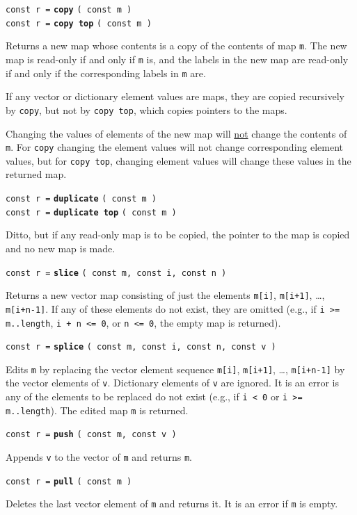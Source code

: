 \documentclass[12pt]{article}
\newcommand{\ttkey}[1]{{\tt \bfseries #1}}
\newenvironment{indpar}[1][0.3in]%
	{\begin{list}{}%
		     {\setlength{\itemsep}{0in}%
		      \setlength{\topsep}{0in}%
		      \setlength{\parsep}{1ex}%
		      \setlength{\labelwidth}{#1}%
		      \setlength{\leftmargin}{#1}%
		      \addtolength{\leftmargin}{\labelsep}}%
	 \item}%
	{\end{list}}
\begin{document}
{\tt const r =} \ttkey{copy} {\tt ( const m )} \\
{\tt const r =} \ttkey{copy top} {\tt ( const m )} %
\label{MAP-COPY}
\begin{indpar}
Returns a new map whose contents is a copy of the contents of
map {\tt m}.  The new map is read-only if and only if {\tt m} is,
and the labels in the new map are read-only if and only if the
corresponding labels in {\tt m} are.

If any vector or dictionary element values are maps, they are
copied recursively by {\tt copy}, but not by
{\tt copy top}, which copies pointers to the maps.

Changing the values of elements of the new map will \underline{not} change
the contents of {\tt m}.  For {\tt copy} changing the element values
will not change corresponding element values, but for {\tt copy top},
changing element values will change these values in the returned map.

\end{indpar}

{\tt const r =} \ttkey{duplicate} {\tt ( const m )} \\
{\tt const r =} \ttkey{duplicate top} {\tt ( const m )}
\begin{indpar}
Ditto, but if any read-only map is to be copied, the pointer
to the map is copied and no new map is made.
\end{indpar}

{\tt const r =} \ttkey{slice} {\tt ( const m, const i, const n )}
\begin{indpar}
Returns a new vector map consisting of just the
elements {\tt m[i]}, {\tt m[i+1]}, \ldots, {\tt m[i+n-1]}.  
If any of these elements do not exist, they are omitted (e.g.,
if {\tt i >= m..length}, {\tt i + n <= 0}, or {\tt n <= 0},
the empty map is returned).
\end{indpar}

{\tt const r =} \ttkey{splice} {\tt ( const m, const i, const n, const v )}
\begin{indpar}
Edits {\tt m} by replacing the vector element sequence
{\tt m[i]}, {\tt m[i+1]}, \ldots, {\tt m[i+n-1]} by the
vector elements of {\tt v}.  Dictionary elements of {\tt v} are ignored.
It is an error is any of the elements to be replaced do not exist
(e.g., if {\tt i < 0} or {\tt i >= m..length}).
The edited map {\tt m} is returned.
\end{indpar}

{\tt const r =} \ttkey{push} {\tt ( const m, const v )}
\begin{indpar}
Appends {\tt v} to the vector of {\tt m} and returns {\tt m}.
\end{indpar}

{\tt const r =} \ttkey{pull} {\tt ( const m )}
\begin{indpar}
Deletes the last vector element of {\tt m} and returns it.
It is an error if {\tt m} is empty.
\end{indpar}

\printindex
\end{document}
